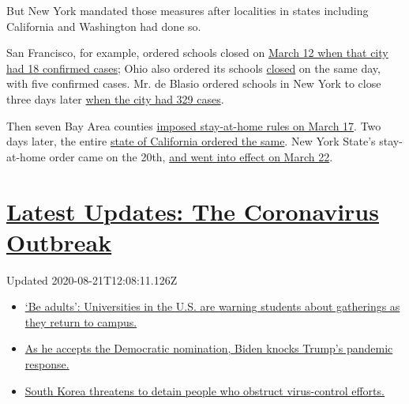 But New York mandated those measures after localities in states
including California and Washington had done so.

San Francisco, for example, ordered schools closed on
\href{https://www.kron4.com/health/coronavirus/san-francisco-reports-4-new-coronavirus-cases-bringing-total-to-18/}{March
12 when that city had 18 confirmed cases}; Ohio also ordered its schools
\href{https://www.usnews.com/news/education-news/articles/2020-03-12/ohio-gov-mike-dewine-orders-all-k-12-schools-closed}{closed}
on the same day, with five confirmed cases. Mr. de Blasio ordered
schools in New York to close three days later
\href{https://www.governor.ny.gov/news/governor-cuomo-calls-president-trump-take-comprehensive-federal-action-combat-novel-coronavirus}{when
the city had 329 cases}.

Then seven Bay Area counties
\href{https://www.nytimes3xbfgragh.onion/2020/03/16/us/california-covid-19.html}{imposed
stay-at-home rules on March 17}. Two days later, the entire
\href{https://www.nytimes3xbfgragh.onion/2020/03/19/us/California-stay-at-home-order-virus.html}{state
of California ordered the same}. New York State's stay-at-home order
came on the 20th,
\href{https://www.nytimes3xbfgragh.onion/2020/03/20/us/ny-ca-stay-home-order.html}{and
went into effect on March 22}.

\hypertarget{latest-updates-the-coronavirus-outbreak}{%
\section{\texorpdfstring{\href{https://www.nytimes3xbfgragh.onion/2020/08/21/world/covid-19-coronavirus.html?action=click\&pgtype=Article\&state=default\&region=MAIN_CONTENT_1\&context=storylines_live_updates}{Latest
Updates: The Coronavirus
Outbreak}}{Latest Updates: The Coronavirus Outbreak}}\label{latest-updates-the-coronavirus-outbreak}}

Updated 2020-08-21T12:08:11.126Z

\begin{itemize}
\tightlist
\item
  \href{https://www.nytimes3xbfgragh.onion/2020/08/21/world/covid-19-coronavirus.html?action=click\&pgtype=Article\&state=default\&region=MAIN_CONTENT_1\&context=storylines_live_updates\#link-6a60a19d}{`Be
  adults': Universities in the U.S. are warning students about
  gatherings as they return to campus.}
\item
  \href{https://www.nytimes3xbfgragh.onion/2020/08/21/world/covid-19-coronavirus.html?action=click\&pgtype=Article\&state=default\&region=MAIN_CONTENT_1\&context=storylines_live_updates\#link-324af071}{As
  he accepts the Democratic nomination, Biden knocks Trump's pandemic
  response.}
\item
  \href{https://www.nytimes3xbfgragh.onion/2020/08/21/world/covid-19-coronavirus.html?action=click\&pgtype=Article\&state=default\&region=MAIN_CONTENT_1\&context=storylines_live_updates\#link-191d44be}{South
  Korea threatens to detain people who obstruct virus-control efforts.}
\end{itemize}

